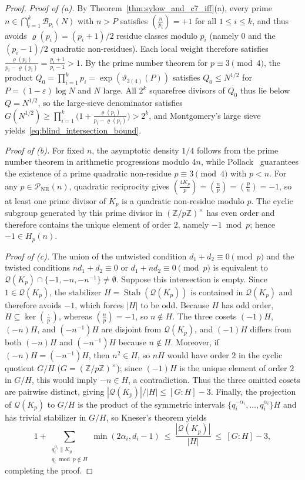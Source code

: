 \documentclass[11pt, a4paper]{article}
\theoremstyle{plain}
\theoremstyle{definition}
\newcommand{\Z}{\mathbb{Z}}
\newcommand{\leg}[2]{\left(\frac{#1}{#2}\right)}
\begin{document}
\begin{proof}
\emph{Proof of (a).} By Theorem~\ref{thm:sylow_and_c7_iff}(a), every prime $n\in\bigcap_{i=1}^{k}\mathcal{B}_{p_i}(N)$ with $n>P$ satisfies $\leg{n}{p_i}=+1$ for all $1\le i\le k$, and thus avoids $\varrho(p_i)=(p_i+1)/2$ residue classes modulo $p_i$ (namely $0$ and the $(p_i-1)/2$ quadratic non-residues). Each local weight therefore satisfies $\frac{\varrho(p_i)}{p_i-\varrho(p_i)}=\frac{p_i+1}{p_i-1}>1$. By the prime number theorem for $p\equiv3\pmod 4$, the product $Q_0=\prod_{i=1}^{k}p_i=\exp(\vartheta_{3(4)}(P))$ satisfies $Q_0\le N^{1/2}$ for $P=(1-\varepsilon)\log N$ and $N$ large. All $2^{k}$ squarefree divisors of $Q_0$ thus lie below $Q=N^{1/2}$, so the large-sieve denominator satisfies $G(N^{1/2})\ge\prod_{i=1}^{k}\big(1+\frac{\varrho(p_i)}{p_i-\varrho(p_i)}\big)>2^{k}$, and Montgomery's large sieve yields~\eqref{eq:blind_intersection_bound}.

\medskip\noindent\emph{Proof of (b).} For fixed $n$, the asymptotic density $1/4$ follows from the prime number theorem in arithmetic progressions modulo $4n$, while Pollack~\cite[Theorem~1]{PollackPrescribed4} guarantees the existence of a prime quadratic non-residue $p\equiv3\pmod 4$ with $p<n$. For any $p\in\mathcal{P}_{\mathrm{NR}}(n)$, quadratic reciprocity gives $\leg{4K_p}{p}=\leg{n}{p}=\leg{p}{n}=-1$, so at least one prime divisor of $K_p$ is a quadratic non-residue modulo $p$. The cyclic subgroup generated by this prime divisor in $(\Z/p\Z)^{\times}$ has even order and therefore contains the unique element of order $2$, namely $-1\bmod p$; hence $-1\in H_p(n)$.

\medskip\noindent\emph{Proof of (c).} The union of the untwisted condition $d_1+d_2\equiv0\pmod p$ and the twisted conditions $nd_1+d_2\equiv0$ or $d_1+nd_2\equiv0\pmod p$ is equivalent to $\mathcal{Q}(K_p)\cap\{-1,-n,-n^{-1}\}\neq\emptyset$. Suppose this intersection is empty. Since $1\in\mathcal{Q}(K_p)$, the stabilizer $H=\operatorname{Stab}(\mathcal{Q}(K_p))$ is contained in $\mathcal{Q}(K_p)$ and therefore avoids $-1$, which forces $|H|$ to be odd. Because $H$ has odd order, $H\subseteq\ker\leg{\cdot}{p}$, whereas $\leg{n}{p}=-1$, so $n\notin H$. The three cosets $(-1)H$, $(-n)H$, and $(-n^{-1})H$ are disjoint from $\mathcal{Q}(K_p)$, and $(-1)H$ differs from both $(-n)H$ and $(-n^{-1})H$ because $n\notin H$. Moreover, if $(-n)H=(-n^{-1})H$, then $n^{2}\in H$, so $nH$ would have order $2$ in the cyclic quotient $G/H$ ($G=(\Z/p\Z)^{\times}$); since $(-1)H$ is the unique element of order $2$ in $G/H$, this would imply $-n\in H$, a contradiction. Thus the three omitted cosets are pairwise distinct, giving $|\mathcal{Q}(K_p)|/|H|\le[G:H]-3$. Finally, the projection of $\mathcal{Q}(K_p)$ to $G/H$ is the product of the symmetric intervals $\{q_i^{-\alpha_i},\dots,q_i^{\alpha_i}\}H$ and has trivial stabilizer in $G/H$, so Kneser's theorem yields
\[
1+\sum_{\substack{q_i^{\alpha_i}\parallel K_p\\ q_i\bmod p\notin H}}\min(2\alpha_i,d_i-1)\ \le\ \frac{|\mathcal{Q}(K_p)|}{|H|}\ \le\ [G:H]-3,
\]
completing the proof.
\end{proof}
\end{document}
